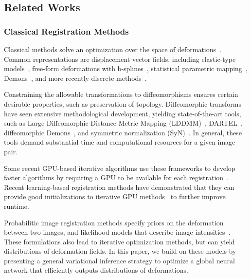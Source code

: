 \documentclass{article}
\newcommand{\citep}{\cite}
\begin{document}
\subsection{Related Works}


\subsubsection{Classical Registration Methods}
Classical methods solve an optimization over the space of deformations~\citep{ashburner2007,avants2008,bajcsy1989,beg2005,dalca2016,glocker2008,thirion1998, yeo2010learning, zhang2017}. Common representations are displacement vector fields, including elastic-type models~\citep{bajcsy1989, davatzikos1997, shen2002}, free-form deformations with b-splines~\citep{rueckert1999}, statistical parametric mapping~\citep{ashburner2000}, Demons~\citep{pennec1999, thirion1998}, and more recently  discrete methods~\citep{dalca2016, heinrich2013mrf, glocker2008}.

Constraining the allowable transformations to diffeomorphisms ensures certain desirable properties, such as preservation of topology. Diffeomorphic transforms have seen extensive methodological development, yielding state-of-the-art tools, such as Large Diffeomorphic Distance Metric Mapping (LDDMM)~\citep{beg2005,cao2005large,ceritoglu2009multi, hernandez2009registration, joshi2000landmark, miller2005increasing, oishi2009atlas, zhang2017}, DARTEL~\citep{ashburner2007}, diffeomorphic Demons~\citep{vercauteren2009}, and symmetric normalization (SyN)~\citep{avants2008}. In general, these tools demand substantial time and computational resources for a given image pair. 
	
Some recent GPU-based iterative algorithms use these frameworks to develop faster algorithms by requiring a GPU to be available for each registration~\citep{modat2010fast,modat2014global}. Recent learning-based registration methods have demonstrated that they can provide good initializations to iterative GPU methods~\citep{balakrishnan2019} to further improve runtime. 

{\color{blue}Probabilitic image registration methods specify priors on the deformation between two images, and likelihood models that describe image intensities~\citep{simpson2012probabilistic,zhang2017,heinrich2016deformable,risholm2013,amirkhalili2017}. These formulations also lead to iterative optimization methods, but can yield distributions of deformation fields. In this paper, we build on these models by presenting a general variational inference strategy to optimize a global neural network that efficiently outputs distributions of deformations.}
\end{document}
